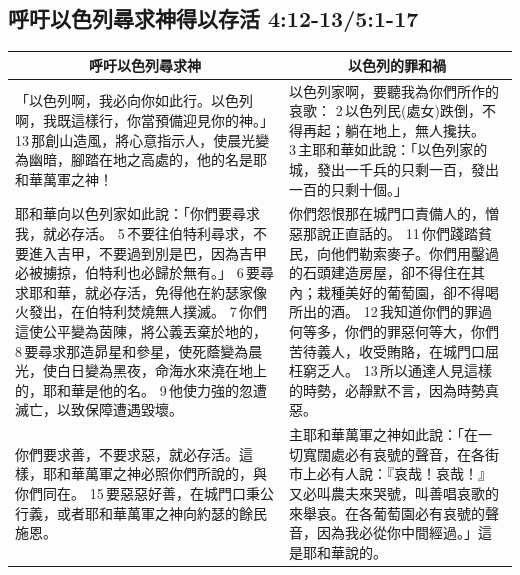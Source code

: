 \subsection{呼吁以色列尋求神得以存活 4:12-13/5:1-17}
\begin{table}[H]
\centering
\begin{tabular}{p{9cm}|p{8.50cm}}\hline\hline
\multicolumn{1}{c|}{呼吁以色列尋求神}&\multicolumn{1}{c}{以色列的罪和禍}\\\hline
「以色列啊，我必向你如此行。以色列啊，我既這樣行，你當預備迎見你的神。」 13 那創山造風，將心意指示人，使晨光變為幽暗，腳踏在地之高處的，他的名是耶和華萬軍之神！
&以色列家啊，要聽我為你們所作的哀歌： 2 以色列民(處女)跌倒，不得再起；躺在地上，無人攙扶。 3 主耶和華如此說：「以色列家的城，發出一千兵的只剩一百，發出一百的只剩十個。」\\\hline
耶和華向以色列家如此說：「你們要尋求我，就必存活。 5 不要往伯特利尋求，不要進入吉甲，不要過到別是巴，因為吉甲必被擄掠，伯特利也必歸於無有。」 6 要尋求耶和華，就必存活，免得他在約瑟家像火發出，在伯特利焚燒無人撲滅。 7 你們這使公平變為茵陳，將公義丟棄於地的， 8 要尋求那造昴星和參星，使死蔭變為晨光，使白日變為黑夜，命海水來澆在地上的，耶和華是他的名。 9 他使力強的忽遭滅亡，以致保障遭遇毀壞。
&你們怨恨那在城門口責備人的，憎惡那說正直話的。 11 你們踐踏貧民，向他們勒索麥子。你們用鑿過的石頭建造房屋，卻不得住在其內；栽種美好的葡萄園，卻不得喝所出的酒。 12 我知道你們的罪過何等多，你們的罪惡何等大，你們苦待義人，收受賄賂，在城門口屈枉窮乏人。 13 所以通達人見這樣的時勢，必靜默不言，因為時勢真惡。\\\hline
你們要求善，不要求惡，就必存活。這樣，耶和華萬軍之神必照你們所說的，與你們同在。 15 要惡惡好善，在城門口秉公行義，或者耶和華萬軍之神向約瑟的餘民施恩。
&主耶和華萬軍之神如此說：「在一切寬闊處必有哀號的聲音，在各街市上必有人說：『哀哉！哀哉！』又必叫農夫來哭號，叫善唱哀歌的來舉哀。在各葡萄園必有哀號的聲音，因為我必從你中間經過。」這是耶和華說的。\\\hline
\end{tabular}
\end{table}
 





